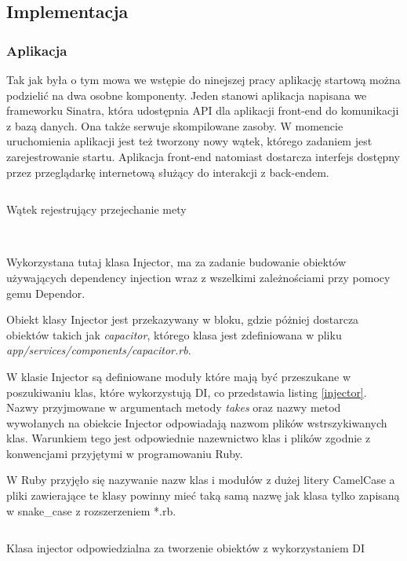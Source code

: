 \documentclass[11pt,a4paper, twoside]{article}
\begin{document}
\subsection{Implementacja}
\subsubsection{Aplikacja}
Tak jak była o tym mowa we wstępie do ninejszej pracy aplikację startową można podzielić na dwa osobne komponenty. Jeden stanowi aplikacja napisana we frameworku Sinatra, która udostępnia API dla aplikacji front-end do komunikacji z bazą danych. Ona także serwuje skompilowane zasoby. W momencie uruchomienia aplikacji jest też tworzony nowy wątek, którego zadaniem jest zarejestrowanie startu. 
	Aplikacja front-end natomiast dostarcza interfejs dostępny przez przeglądarkę internetową służący do interakcji z back-endem.
\begin{listing}[H]
\inputminted[linenos=true]{ruby}{./src/thread.rb}
\caption{Wątek rejestrujący przejechanie mety}
$\label{thread}$
\end{listing}
\newpage
Wykorzystana tutaj klasa Injector, ma za zadanie budowanie obiektów używających dependency injection wraz z wszelkimi zależnościami przy pomocy gemu Dependor. 


Obiekt klasy Injector jest 	przekazywany w bloku, gdzie póżniej dostarcza obiektów takich jak \emph{capacitor}, którego klasa jest zdefiniowana w pliku \emph{app/services/components/capacitor.rb}. 

W klasie Injector są definiowane moduły które mają być przeszukane w poszukiwaniu klas, które wykorzystują DI, co przedstawia listing \ref{injector}. Nazwy przyjmowane w argumentach metody \emph{takes} oraz nazwy metod wywołanych na obiekcie Injector odpowiadają nazwom plików wstrszykiwanych klas. Warunkiem tego jest odpowiednie nazewnictwo klas i plików zgodnie z konwencjami przyjętymi w programowaniu Ruby.

W Ruby przyjęło się nazywanie nazw klas i modułów z dużej litery \mbox{CamelCase} a pliki zawierające te klasy powinny mieć taką samą nazwę jak klasa tylko zapisaną w snake\_case z rozszerzeniem *.rb.
\begin{listing}[H]
\inputminted[linenos=true]{ruby}{./src/injector.rb}
\caption{Klasa injector odpowiedzialna za tworzenie obiektów z wykorzystaniem DI}
$\label{injector}$
\end{listing}
\end{document}
